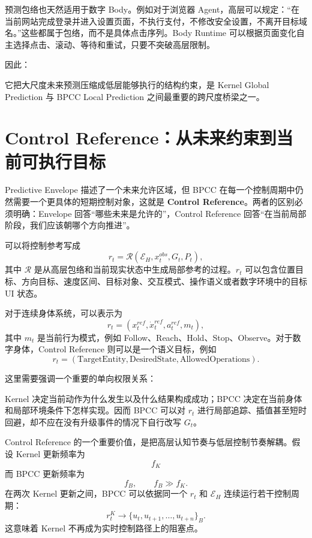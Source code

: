 预测包络也天然适用于数字 Body。例如对于浏览器 Agent，高层可以规定：“在当前网站完成登录并进入设置页面，不执行支付，不修改安全设置，不离开目标域名。”这些都属于包络，而不是具体点击序列。Body Runtime 可以根据页面变化自主选择点击、滚动、等待和重试，只要不突破高层限制。

因此：
\begin{statementbox}
\centering
{}
\end{statementbox}
它把大尺度未来预测压缩成低层能够执行的结构约束，是 Kernel Global Prediction 与 BPCC Local Prediction 之间最重要的跨尺度桥梁之一。

\section{Control Reference：从未来约束到当前可执行目标}

Predictive Envelope 描述了一个未来允许区域，但 BPCC 在每一个控制周期中仍然需要一个更具体的短期控制对象，这就是 \textbf{Control Reference}。两者的区别必须明确：Envelope 回答“哪些未来是允许的”，Control Reference 回答“在当前局部阶段，我们应该朝哪个方向推进”。

可以将控制参考写成
\[
r_t
=
\mathcal R
\left(
\mathcal E_H,
x_t^{obs},
G_t,
P_t
\right),
\]
其中 $\mathcal R$ 是从高层包络和当前现实状态中生成局部参考的过程。$r_t$ 可以包含位置目标、方向目标、速度区间、目标对象、交互模式、操作语义或者数字环境中的目标 UI 状态。

对于连续身体系统，可以表示为
\[
r_t=
(
x_t^{ref},
\dot x_t^{ref},
a_t^{ref},
m_t
),
\]
其中 $m_t$ 是当前行为模式，例如 Follow、Reach、Hold、Stop、Observe。对于数字身体，Control Reference 则可以是一个语义目标，例如
\[
r_t=
(\text{TargetEntity},
\text{DesiredState},
\text{AllowedOperations}).
\]

这里需要强调一个重要的单向权限关系：
\begin{statementbox}
\centering
{}
\end{statementbox}
Kernel 决定当前动作为什么发生以及什么结果构成成功；BPCC 决定在当前身体和局部环境条件下怎样实现。因而 BPCC 可以对 $r_t$ 进行局部追踪、插值甚至短时回避，却不应在没有升级事件的情况下自行改写 $G_t$。

Control Reference 的一个重要价值，是把高层认知节奏与低层控制节奏解耦。假设 Kernel 更新频率为
\[
f_K
\]
而 BPCC 更新频率为
\[
f_B,
\qquad
f_B\gg f_K.
\]
在两次 Kernel 更新之间，BPCC 可以依据同一个 $r_t$ 和 $\mathcal E_H$ 连续运行若干控制周期：
\[
r_{t}^{K}
\rightarrow
\{u_t,u_{t+1},\ldots,u_{t+n}\}_B.
\]
这意味着 Kernel 不再成为实时控制路径上的阻塞点。

